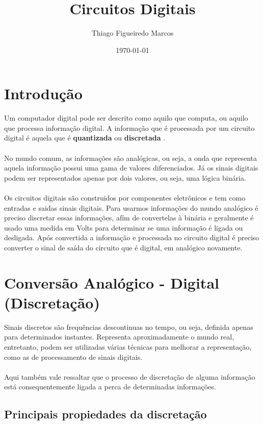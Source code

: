 \documentclass[12pt, onecolumn]{article}
\title{Circuitos Digitais}
\author{Thiago Figueiredo Marcos}
\date{\today}
\begin{document}
	
	\maketitle

			\section{\centering Introdução}
	
	Um computador digital pode ser descrito como aquilo que computa, ou aquilo 
	que processa informação digital. A informação que é processada por um circuito 
	digital é aquela que é \textbf{quantizada} ou \textbf{discretada} \citep{art1}.\\
	\\
	No mundo comum, as informações são analógicas, ou seja, a onda que representa 
	aquela informação possui uma gama de valores diferenciados. Já os sinais digitais
	podem ser representados apenas por dois valores, ou seja, uma lógica binária.\citep{bk1}\\ 
	\\
	Os circuitos digitais são construidos por componentes eletrônicos e tem como
	entradas e saidas sinais digitais. Para usarmos informações do mundo analógico
	é preciso discretar essas informações, afím de convertelas à binária e geralmente é
	usado uma medida em Volts para determinar se uma informação é ligada ou desligada. 
	Após convertida a informação e processada no circuito digital é preciso converter
	o sinal de saída do circuito que é digital, em analógico novamente.\citep{art2}

		\section{\centering Conversão Analógico - Digital (Discretação)}
	
	Sinais discretos são frequências descontinuas no tempo, ou seja, definida apenas
	para determinados instantes. Representa aproximadamente o mundo real, entretanto,
	podem ser utilizadas várias técnicas para melhorar a representação, como as de 
	processamento de sinais digitais.\\
	\\
	Aqui também vale ressaltar que o processo de discretação de alguma informação
	está consequentemente ligada a perca de determinadas informações.
		
		\subsection{\centering Principais propiedades da discretação}
		
\end{document}
